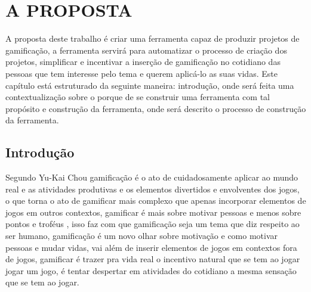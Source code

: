 
\chapter[A Proposta]{A PROPOSTA}

A proposta deste trabalho é criar uma ferramenta capaz de produzir projetos de gamificação, a ferramenta servirá para automatizar o processo de criação dos projetos, simplificar e incentivar a inserção de gamificação no cotidiano das pessoas que tem interesse pelo tema e querem aplicá-lo as suas vidas. Este capítulo está estruturado da seguinte maneira: introdução, onde será feita uma contextualização sobre o porque de se construir uma ferramenta com tal propósito e construção da ferramenta, onde será descrito o processo de construção da ferramenta.           

\section{Introdução}

 

Segundo Yu-Kai Chou gamificação é o ato de cuidadosamente aplicar ao mundo real e as atividades produtivas e os elementos divertidos e envolventes dos jogos, o que torna o ato de gamificar mais complexo que apenas incorporar elementos de jogos em outros contextos, gamificar é mais sobre  motivar pessoas e menos sobre pontos e troféus \cite{chou2015actionable}, isso faz com que gamificação seja um tema que diz respeito ao ser humano, gamificação é um novo olhar sobre motivação e como motivar pessoas e mudar vidas, vai além de inserir elementos de jogos em contextos fora de jogos, gamificar é trazer pra vida real o incentivo natural que se tem ao jogar jogar um jogo, é tentar despertar em atividades do cotidiano a mesma sensação que se tem ao jogar.

